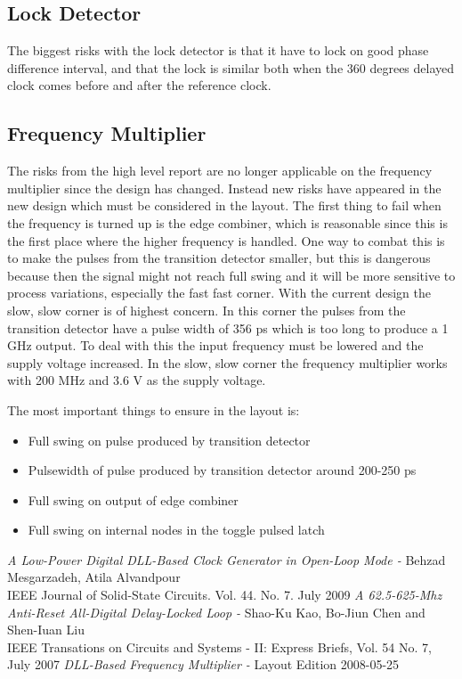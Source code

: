 \documentclass[a4paper,12pt]{article} \usepackage{graphicx}
\begin{document}
\subsection{Lock Detector}
The biggest risks with the lock detector is that it have to lock on
good phase difference interval, and that the lock is similar both when
the 360 degrees delayed clock comes before and after the reference
clock. 
\subsection{Frequency Multiplier}
The risks from the high level report are no longer applicable on the frequency
multiplier since the design has changed. Instead new risks have appeared in the
new design which must be considered in the layout. The first thing to fail when
the frequency is turned up is the edge combiner, which is reasonable since this
is the first place where the higher frequency is handled. One way to combat this
is to make the pulses from the transition detector smaller, but this is
dangerous because then the signal might not reach full swing and it will be more
sensitive to process variations, especially the fast fast corner. With the
current design the slow, slow corner is of highest concern. In this corner the
pulses from the transition detector have a pulse width of 356 ps which is too
long to produce a 1 GHz output. To deal with this the input frequency must be
lowered and the supply voltage increased. In the slow, slow corner the frequency
multiplier works with 200 MHz and 3.6 V as the supply voltage.

The most important things to ensure in the layout is:
\begin{itemize}
        \item Full swing on pulse produced by transition detector
        \item Pulsewidth of pulse produced by transition detector around 200-250 ps
        \item Full swing on output of edge combiner
        \item Full swing on internal nodes in the toggle pulsed latch
\end{itemize}

\newpage 
\appendix 
\newpage

\begin{thebibliography}{99}
        \textit{A Low-Power Digital DLL-Based Clock Generator in Open-Loop Mode - }
                Behzad Mesgarzadeh, Atila Alvandpour \\
                IEEE Journal of Solid-State Circuits. Vol. 44. No. 7. July 2009
        \textit{A 62.5-625-Mhz Anti-Reset All-Digital Delay-Locked Loop - }
                Shao-Ku Kao, Bo-Jiun Chen and Shen-Iuan Liu \\
                IEEE Transations on Circuits and Systems - II: Express Briefs, Vol. 54 No. 7, July 2007
        \textit{DLL-Based Frequency Multiplier - }
                Layout Edition 2008-05-25 

\end{thebibliography}
\end{document}
